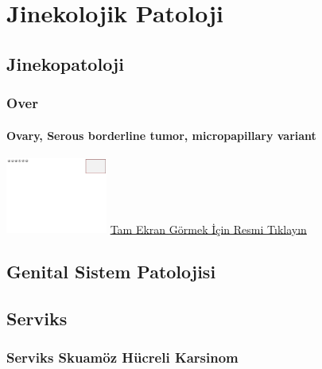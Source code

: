 \documentclass[
  letterpaper,
  DIV=11,
  numbers=noendperiod]{scrreprt}
\begin{document}
\part{Jinekolojik Patoloji}

\hypertarget{sec-jinekopatoloji}{%
\chapter{Jinekopatoloji}\label{sec-jinekopatoloji}}

\hypertarget{sec-over}{%
\section{Over}\label{sec-over}}

\hypertarget{sec-ovary-serous-borderline-micropapillary}{%
\subsection{Ovary, Serous borderline tumor, micropapillary
variant}\label{sec-ovary-serous-borderline-micropapillary}}

\href{https://images.patolojiatlasi.com/template/HE.html}{\includegraphics[width=0.25\textwidth,height=\textheight]{./screenshots/template_screenshot.png}}
\href{https://images.patolojiatlasi.com/ovarianserousmicropapillary/HE.html}{Tam
Ekran Görmek İçin Resmi Tıklayın}

\hypertarget{sec-genital-sistem-patolojisi}{%
\chapter{Genital Sistem
Patolojisi}\label{sec-genital-sistem-patolojisi}}

\hypertarget{sec-serviks}{%
\chapter{Serviks}\label{sec-serviks}}

\hypertarget{sec-serviks-skuamoz-hucreli-karsinom}{%
\section{Serviks Skuamöz Hücreli
Karsinom}\label{sec-serviks-skuamoz-hucreli-karsinom}}
\end{document}
